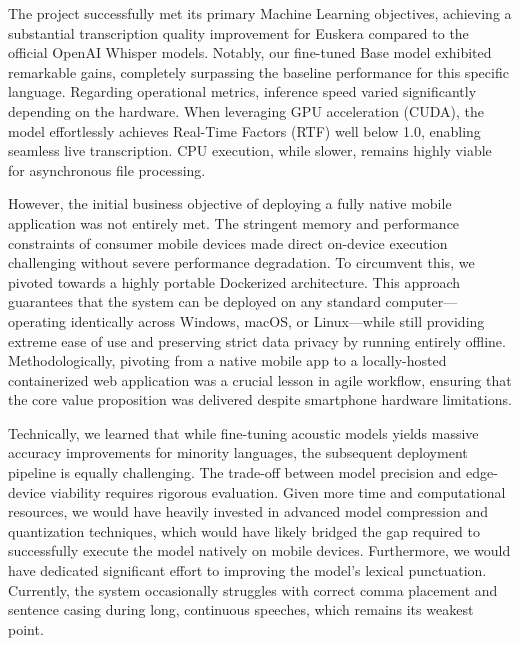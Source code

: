\documentclass[12pt]{article}
\begin{document}
The project successfully met its primary Machine Learning objectives, achieving a substantial transcription quality improvement for Euskera compared to the official OpenAI Whisper models. Notably, our fine-tuned Base model exhibited remarkable gains, completely surpassing the baseline performance for this specific language. Regarding operational metrics, inference speed varied significantly depending on the hardware. When leveraging GPU acceleration (CUDA), the model effortlessly achieves Real-Time Factors (RTF) well below 1.0, enabling seamless live transcription. CPU execution, while slower, remains highly viable for asynchronous file processing.

However, the initial business objective of deploying a fully native mobile application was not entirely met. The stringent memory and performance constraints of consumer mobile devices made direct on-device execution challenging without severe performance degradation. To circumvent this, we pivoted towards a highly portable Dockerized architecture. This approach guarantees that the system can be deployed on any standard computer—operating identically across Windows, macOS, or Linux—while still providing extreme ease of use and preserving strict data privacy by running entirely offline. Methodologically, pivoting from a native mobile app to a locally-hosted containerized web application was a crucial lesson in agile workflow, ensuring that the core value proposition was delivered despite smartphone hardware limitations.

Technically, we learned that while fine-tuning acoustic models yields massive accuracy improvements for minority languages, the subsequent deployment pipeline is equally challenging. The trade-off between model precision and edge-device viability requires rigorous evaluation. Given more time and computational resources, we would have heavily invested in advanced model compression and quantization techniques, which would have likely bridged the gap required to successfully execute the model natively on mobile devices. Furthermore, we would have dedicated significant effort to improving the model's lexical punctuation. Currently, the system occasionally struggles with correct comma placement and sentence casing during long, continuous speeches, which remains its weakest point.
\end{document}
